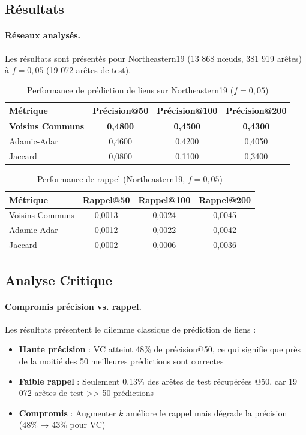 \documentclass[12pt,a4paper]{article}
\begin{document}
\subsection{Résultats}

\paragraph{Réseaux analysés.} Les résultats sont présentés pour Northeastern19 (13 868 nœuds, 381 919 arêtes) à $f=0,05$ (19 072 arêtes de test).

\begin{table}[H]
\centering
\caption{Performance de prédiction de liens sur Northeastern19 ($f=0,05$)}
\label{tab:q4_results}
\begin{tabular}{@{}lccc@{}}
\toprule
\textbf{Métrique} & \textbf{Précision@50} & \textbf{Précision@100} & \textbf{Précision@200} \\
\midrule
\textbf{Voisins Communs} & \textbf{0,4800} & \textbf{0,4500} & \textbf{0,4300} \\
Adamic-Adar & 0,4600 & 0,4200 & 0,4050 \\
Jaccard & 0,0800 & 0,1100 & 0,3400 \\
\bottomrule
\end{tabular}
\end{table}

\begin{table}[H]
\centering
\caption{Performance de rappel (Northeastern19, $f=0,05$)}
\label{tab:q4_recall}
\begin{tabular}{@{}lccc@{}}
\toprule
\textbf{Métrique} & \textbf{Rappel@50} & \textbf{Rappel@100} & \textbf{Rappel@200} \\
\midrule
Voisins Communs & 0,0013 & 0,0024 & 0,0045 \\
Adamic-Adar & 0,0012 & 0,0022 & 0,0042 \\
Jaccard & 0,0002 & 0,0006 & 0,0036 \\
\bottomrule
\end{tabular}
\end{table}

\subsection{Analyse Critique}

\paragraph{Compromis précision vs. rappel.} Les résultats présentent le dilemme classique de prédiction de liens :
\begin{itemize}
    \item \textbf{Haute précision} : VC atteint 48\% de précision@50, ce qui signifie que près de la moitié des 50 meilleures prédictions sont correctes
    \item \textbf{Faible rappel} : Seulement 0,13\% des arêtes de test récupérées @50, car 19 072 arêtes de test >> 50 prédictions
    \item \textbf{Compromis} : Augmenter $k$ améliore le rappel mais dégrade la précision (48\% → 43\% pour VC)
\end{itemize}
\end{document}

